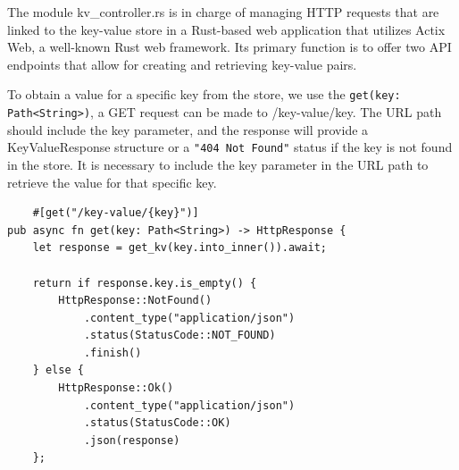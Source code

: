 \documentclass[a4paper, 11pt]{article}
\begin{document}
\par
The module kv\_controller.rs is in charge of managing HTTP requests that are linked to the key-value store in a Rust-based web application that utilizes Actix Web, a well-known Rust web framework. Its primary function is to offer two API endpoints that allow for creating and retrieving key-value pairs.

To obtain a value for a specific key from the store, we use the \verb|get(key: Path<String>)|, a GET request can be made to /key-value/{key}. The URL path should include the key parameter, and the response will provide a KeyValueResponse structure or a \verb|"404 Not Found"| status if the key is not found in the store. It is necessary to include the key parameter in the URL path to retrieve the value for that specific key.
\begin{verbatim}
    #[get("/key-value/{key}")]
pub async fn get(key: Path<String>) -> HttpResponse {
    let response = get_kv(key.into_inner()).await;

    return if response.key.is_empty() {
        HttpResponse::NotFound()
            .content_type("application/json")
            .status(StatusCode::NOT_FOUND)
            .finish()
    } else {
        HttpResponse::Ok()
            .content_type("application/json")
            .status(StatusCode::OK)
            .json(response)
    };

\end{verbatim}
\end{document}
